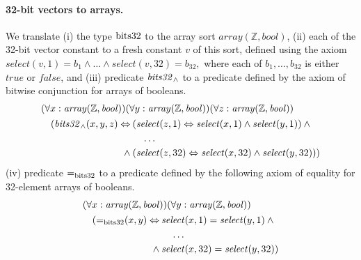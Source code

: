 \paragraph{32-bit vectors to arrays.}
We translate
(i) the type $\mathrm{bits32}$ to the array sort $\mathit{array}(\mathbb{Z},\mathit{bool})$,
(ii) each of the 32-bit vector constant to a fresh constant $v$ of this sort, defined using the axiom $\mathit{select}(v,1)=b_1\wedge\ldots\wedge\allowbreak\mathit{select}(v, 32)=b_{32},$ where each of $b_1,\ldots,b_{32}$ is either $\mathit{true}$ or $\mathit{false}$, and
(iii) predicate $\mathit{bits32}_\wedge$ to a predicate defined by the axiom of bitwise conjunction for arrays of booleans.
\begin{equation*}
\begin{aligned}
&(\forall x:\mathit{array}(\mathbb{Z},\mathit{bool}))(\forall y:\mathit{array}(\mathbb{Z},\mathit{bool}))(\forall z:\mathit{array}(\mathbb{Z},\mathit{bool}))\\
&\quad\begin{aligned}
      (\mathit{bits32}_\wedge(x,y,z)\Leftrightarrow\:&(\mathit{select}(z,1)\Leftrightarrow\mathit{select}(x,1)\wedge\mathit{select}(y,1))\:\wedge\\
      &\quad\ldots\\
      \wedge\:&(\mathit{select}(z,32)\Leftrightarrow\mathit{select}(x,32)\wedge\mathit{select}(y,32)))
      \end{aligned}
\end{aligned}
\end{equation*}
(iv) predicate $\mathit{=}_{\mathrm{bits32}}$ to a predicate defined by the following axiom of equality for 32-element arrays of booleans.
\begin{equation*}
\begin{aligned}
&(\forall x:\mathit{array}(\mathbb{Z},\mathit{bool}))(\forall y:\mathit{array}(\mathbb{Z},\mathit{bool}))\\
&\quad\begin{aligned}
      (\mathit{=}_{\mathrm{bits32}}(x, y)\Leftrightarrow\:&\mathit{select}(x,1)=\mathit{select}(y,1)\:\wedge\\
      &\quad\ldots\\
      \wedge\:&\mathit{select}(x, 32)=\mathit{select}(y,32))
      \end{aligned}
\end{aligned}
\end{equation*}


